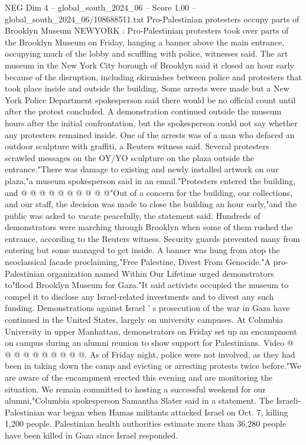 \begin{textsample}{NEG Dim 4 – global\_south\_2024\_06 – Score 1.00 – global\_south\_2024\_06/108688511.txt}  \label{ex:f4_neg_372}
Pro-Palestinian protesters occupy parts of Brooklyn Museum NEWYORK : Pro-Palestinian protesters took over parts of the Brooklyn Museum on Friday, hanging a banner above the main entrance, occupying much of the lobby and scuffling with police, witnesses said.
The art museum in the New York City borough of Brooklyn said it closed an hour early because of the disruption, including skirmishes between police and protesters that took place inside and outside the building.
Some arrests were made but a New York Police Department spokesperson said there would be no official count until after the protest concluded.
A demonstration continued outside the museum hours after the initial confrontation, but the spokesperson could not say whether any protesters remained inside.
One of the arrests was of a man who defaced an outdoor sculpture with graffiti, a Reuters witness said.
Several protesters scrawled messages on the OY/YO sculpture on the plaza outside the entrance."There was damage to existing and newly installed artwork on our plaza,"a museum spokesperson said in an email."Protesters entered the building, and @ @ @ @ @ @ @ @ @ @"Out of a concern for the building, our collections, and our staff, the decision was made to close the building an hour early,"and the public was asked to vacate peacefully, the statement said.
Hundreds of demonstrators were marching through Brooklyn when some of them rushed the entrance, according to the Reuters witness.
Security guards prevented many from entering but some managed to get inside.
A banner was hung from atop the neoclassical facade proclaiming,"Free Palestine, Divest From Genocide."A pro-Palestinian organization named Within Our Lifetime urged demonstrators to"flood Brooklyn Museum for Gaza."It said activists occupied the museum to compel it to disclose any Israel-related investments and to divest any such funding.
Demonstrations against Israel ' s prosecution of the war in Gaza have continued in the United States, largely on university campuses.
At Columbia University in upper Manhattan, demonstrators on Friday set up an encampment on campus during an alumni reunion to show support for Palestinians.
Video @ @ @ @ @ @ @ @ @ @.
As of Friday night, police were not involved, as they had been in taking down the camp and evicting or arresting protests twice before."We are aware of the encampment erected this evening and are monitoring the situation.
We remain committed to hosting a successful weekend for our alumni,"Columbia spokesperson Samantha Slater said in a statement.
The Israeli-Palestinian war began when Hamas militants attacked Israel on Oct. 7, killing 1,200 people.
Palestinian health authorities estimate more than 36,280 people have been killed in Gaza since Israel responded.

\end{textsample}
